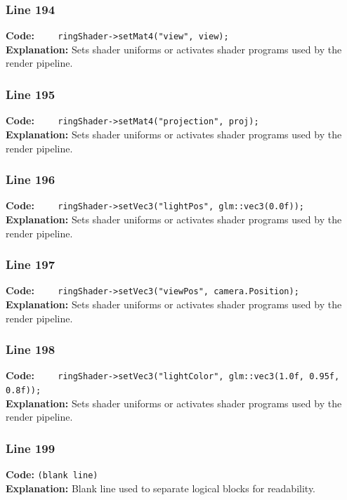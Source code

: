 \documentclass[11pt,a4paper]{article}
\begin{document}
\subsubsection*{Line 194}
\textbf{Code:} \verb|    ringShader->setMat4("view", view);|\\
\textbf{Explanation:} Sets shader uniforms or activates shader programs used by the render pipeline.

\subsubsection*{Line 195}
\textbf{Code:} \verb|    ringShader->setMat4("projection", proj);|\\
\textbf{Explanation:} Sets shader uniforms or activates shader programs used by the render pipeline.

\subsubsection*{Line 196}
\textbf{Code:} \verb|    ringShader->setVec3("lightPos", glm::vec3(0.0f));|\\
\textbf{Explanation:} Sets shader uniforms or activates shader programs used by the render pipeline.

\subsubsection*{Line 197}
\textbf{Code:} \verb|    ringShader->setVec3("viewPos", camera.Position);|\\
\textbf{Explanation:} Sets shader uniforms or activates shader programs used by the render pipeline.

\subsubsection*{Line 198}
\textbf{Code:} \verb|    ringShader->setVec3("lightColor", glm::vec3(1.0f, 0.95f, 0.8f));|\\
\textbf{Explanation:} Sets shader uniforms or activates shader programs used by the render pipeline.

\subsubsection*{Line 199}
\textbf{Code:} \texttt{(blank line)}\\
\textbf{Explanation:} Blank line used to separate logical blocks for readability.
\end{document}
